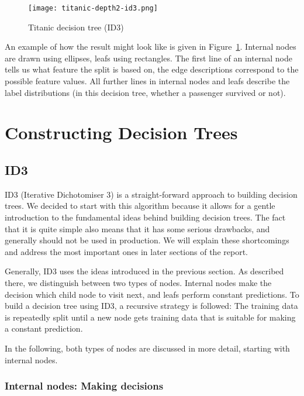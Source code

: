 \documentclass[a4paper]{article}
\begin{document}
\begin{figure}[h]
	\texttt{[image: titanic-depth2-id3.png]}
    \caption{Titanic decision tree (ID3)}
    \label{fig:drawing-titanic}
\end{figure}

An example of how the result might look like is given in Figure~\ref{fig:drawing-titanic}. Internal nodes are drawn using ellipses, leafs using rectangles. The first line of an internal node tells us what feature the split is based on, the edge descriptions correspond to the possible feature values. All further lines in internal nodes and leafs describe the label distributions (in this decision tree, whether a passenger survived or not).

\section{Constructing Decision Trees}

\subsection{ID3}

ID3 (Iterative Dichotomiser 3) \cite{mitchell1997machine, quinlan1986induction} is a straight-forward approach to building decision trees. We decided to start with this algorithm because it allows for a gentle introduction to the fundamental ideas behind building decision trees.
The fact that it is quite simple also means that it has some serious drawbacks, and generally should not be used in production. We will explain these shortcomings and address the most important ones in later sections of the report.

Generally, ID3 uses the ideas introduced in the previous section.
As described there, we distinguish between two types of nodes. Internal nodes make the decision which child node to visit next, and leafs perform constant predictions.
To build a decision tree using ID3, a recursive strategy is followed: The training data is repeatedly split until a new node gets training data that is suitable for making a constant prediction.

In the following, both types of nodes are discussed in more detail, starting with internal nodes.

\subsubsection{Internal nodes: Making decisions}
\end{document}
